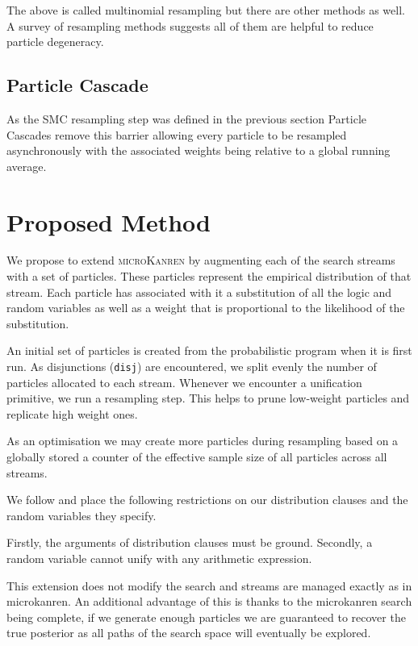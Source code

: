 \documentclass[
]{ceurart}
\begin{document}
The above is called multinomial resampling but there are other methods
as well. A survey\cite{douc2005comparison} of resampling methods
suggests all of them are helpful to reduce particle degeneracy.

\subsection{Particle Cascade}

As the SMC resampling step was defined in the previous section
Particle Cascades \cite{PaigeWDT14} remove this barrier allowing
every particle to be resampled asynchronously with the associated
weights being relative to a global running average. %

\section{Proposed Method}

We propose to extend \textsc{microKanren} by augmenting each of the
search streams with a set of particles. These particles represent the
empirical distribution of that stream. Each particle has associated
with it a substitution of all the logic and random variables as well
as a weight that is proportional to the likelihood of the substitution.

An initial set of particles is created from the probabilistic program
when it is first run. As disjunctions (\texttt{disj}) are encountered,
we split evenly the number of particles allocated to each stream. Whenever
we encounter a unification primitive, we run a resampling step. This
helps to prune low-weight particles and replicate high weight ones.

As an optimisation we may create more particles during resampling
based on a globally stored a counter of the effective sample size of
all particles across all streams.

We follow \cite{gutmann2010extending} and place the following restrictions
on our distribution clauses and the random variables they specify.

Firstly, the arguments of distribution clauses must be
ground. Secondly, a random variable cannot unify with any arithmetic
expression.

This extension does not modify the search and streams are managed
exactly as in microkanren. An additional advantage of this is thanks
to the microkanren search being complete, if we generate enough
particles we are guaranteed to recover the true posterior as all paths
of the search space will eventually be explored.
\end{document}
